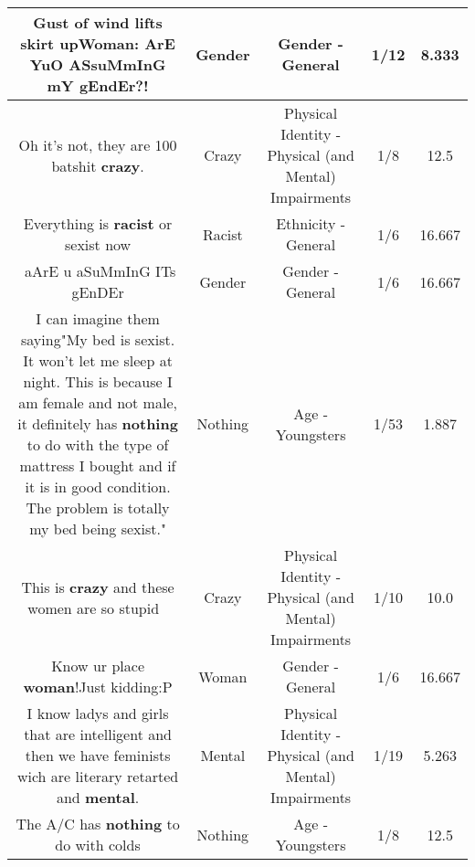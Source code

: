 \documentclass[11pt]{article}
\newlength\mylength
\begin{document}
\begin{center}
\begin{longtable}{|C{.65\mylength}|C{.30\mylength}|C{.12\mylength}|C{.12\mylength}|C{.12\mylength}|}
  \small Gust of wind lifts skirt upWoman: ArE YuO ASsuMmInG mY \textbf{gEndEr}?!\normalsize   & Gender & Gender - General & 1/12 & 8.333 \\  \hline
  \small Oh it's not, they are 100 batshit \textbf{crazy}.\normalsize   & Crazy & Physical Identity - Physical (and Mental) Impairments & 1/8 & 12.5 \\  \hline
  \small Everything is \textbf{racist} or sexist now\normalsize   & Racist & Ethnicity - General & 1/6 & 16.667 \\  \hline
  \small ​ aArE  u aSuMmInG ITs gEnDEr\normalsize   & Gender & Gender - General & 1/6 & 16.667 \\  \hline
  \small I can imagine them saying"My bed is sexist. It won't let me sleep at night. This is because I am female and not male, it definitely has \textbf{nothing} to do with the type of mattress I bought and if it is in good condition. The problem is totally my bed being sexist."\normalsize   & Nothing & Age - Youngsters & 1/53 & 1.887 \\  \hline
  \small This is \textbf{crazy} and these women are so stupid 🤦\normalsize   & Crazy & Physical Identity - Physical (and Mental) Impairments & 1/10 & 10.0 \\  \hline
  \small Know ur place \textbf{woman}!Just kidding:P\normalsize   & Woman & Gender - General & 1/6 & 16.667 \\  \hline
  \small I know ladys and girls that are intelligent and then we have feminists wich are literary retarted and \textbf{mental}.\normalsize   & Mental & Physical Identity - Physical (and Mental) Impairments & 1/19 & 5.263 \\  \hline
  \small The A/C has \textbf{nothing} to do with colds\normalsize   & Nothing & Age - Youngsters & 1/8 & 12.5 \\  \hline

\end{longtable}
\end{center}
\end{document}
